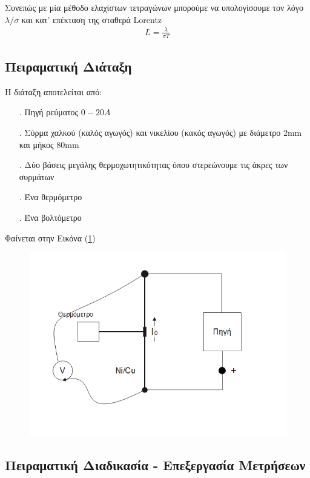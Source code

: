 \documentclass[a4paper]{article}
\begin{document}
		Συνεπώς με μία μέθοδο ελαχίστων τετραγώνων μπορούμε να υπολογίσουμε τον λόγο $\lambda/\sigma$ και κατ' επέκταση της σταθερά Lorentz  
		\begin{align}
			L = \frac{\lambda}{\sigma T}	
		\end{align}					 	
\subsection*{Πειραματική Διάταξη}
	Η διάταξη αποτελείται από: 
		\begin{itemize}
			\item[.] Πηγή ρεύματος $0-20Α$
			\item[.] Σύρμα χαλκού (καλός αγωγός) και νικελίου (κακός αγωγός) με διάμετρο 2mm και μήκος 80mm
			\item[.] Δύο βάσεις μεγάλης θερμοχωτητικότητας όπου στερεώνουμε τις άκρες των συρμάτων 
			\item[.] Ένα θερμόμετρο 
			\item[.] Ένα βολτόμετρο
		\end{itemize}
		Φαίνεται στην Εικόνα (\ref{Im1})
		
		\begin{figure}[h!]
			\centering
			\includegraphics[width=0.45\linewidth]{setup.png}
			\caption{ }
			\label{Im1}
		\end{figure}
		
\subsection*{Πειραματική Διαδικασία - Επεξεργασία Μετρήσεων}
\end{document}
